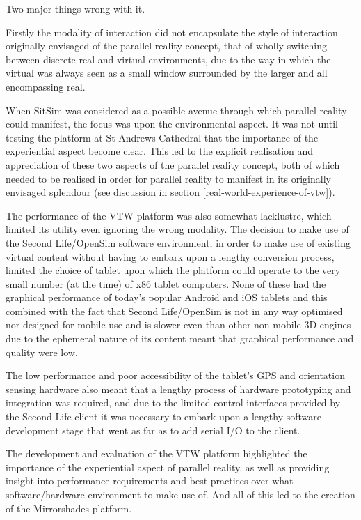 Two major things wrong with it.

Firstly the modality of interaction did not encapsulate the style of interaction originally envisaged of the parallel reality concept, that of wholly switching between discrete real and virtual environments, due to the way in which the virtual was always seen as a small window surrounded by the larger and all encompassing real.

When SitSim was considered as a possible avenue through which parallel reality could manifest, the focus was upon the environmental aspect. It was not until testing the platform at St Andrews Cathedral that the importance of the experiential aspect become clear. This led to the explicit realisation and appreciation of these two aspects of the parallel reality concept, both of which needed to be realised in order for parallel reality to manifest in its originally envisaged splendour (see discussion in section \ref{real-world-experience-of-vtw}).

The performance of the VTW platform was also somewhat lacklustre, which limited its utility even ignoring the wrong modality. The decision to make use of the Second Life/OpenSim software environment, in order to make use of existing virtual content without having to embark upon a lengthy conversion process, limited the choice of tablet upon which the platform could operate to the very small number (at the time) of x86 tablet computers. None of these had the graphical performance of today's popular Android and iOS tablets and this combined with the fact that Second Life/OpenSim is not in any way optimised nor designed for mobile use and is slower even than other non mobile 3D engines due to the ephemeral nature of its content meant that graphical performance and quality were low.

The low performance and poor accessibility of the tablet's GPS and orientation sensing hardware also meant that a lengthy process of hardware prototyping and integration was required, and due to the limited control interfaces provided by the Second Life client it was necessary to embark upon a lengthy software development stage that went as far as to add serial I/O to the client.


The development and evaluation of the VTW platform highlighted the importance of the experiential aspect of parallel reality, as well as providing insight into performance requirements and best practices over what software/hardware environment to make use of. And all of this led to the creation of the Mirrorshades platform.

